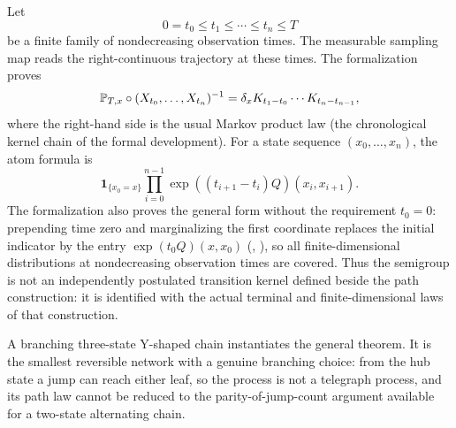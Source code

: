 Let
\[
  0=t_0\le t_1\le\cdots\le t_n\le T
\]
be a finite family of nondecreasing observation times. The measurable sampling map reads the right-continuous trajectory at these times. The formalization proves
\begin{equation}
\label{eq:fdd}
  \mathbb{P}_{T,x}\circ (X_{t_0},\ldots,X_{t_n})^{-1}
  = \delta_x K_{t_1-t_0}\cdots K_{t_n-t_{n-1}},
\end{equation}
where the right-hand side is the usual Markov product law (the chronological kernel chain of the formal development). For a state sequence $(x_0,\ldots,x_n)$, the atom formula is
\begin{equation}
\label{eq:fdd-atom}
  \mathbf{1}_{\{x_0=x\}}
  \prod_{i=0}^{n-1}
  \exp((t_{i+1}-t_i)Q)(x_i,x_{i+1}).
\end{equation}
The formalization also proves the general form without the requirement $t_0=0$:
prepending time zero and marginalizing the first coordinate replaces the initial
indicator by the entry $\exp(t_0Q)(x,x_0)$
(,
), so all
finite-dimensional distributions at nondecreasing observation times are covered.
Thus the semigroup is not an independently postulated transition kernel defined beside the path construction: it is identified with the actual terminal and finite-dimensional laws of that construction.

A branching three-state Y-shaped chain instantiates the general theorem. It is the smallest reversible network with a genuine branching choice: from the hub state a jump can reach either leaf, so the process is not a telegraph process, and its path law cannot be reduced to the parity-of-jump-count argument available for a two-state alternating chain.
